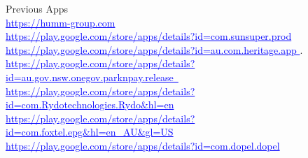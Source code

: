 \documentclass{article}
\begin{document}
Previous Apps \\
\textcolor{blue} { \underline{  https://humm-group.com  } }  \\
\textcolor{blue} { \underline{ https://play.google.com/store/apps/details?id=com.sunsuper.prod   } }  \\
\textcolor{blue} { \underline{  https://play.google.com/store/apps/details?id=au.com.heritage.app  }}. \\ 
\textcolor{blue} { \underline{ https://play.google.com/store/apps/details?id=au.gov.nsw.onegov.parknpay.release\  } }  \\  
\textcolor{blue} { \underline{https://play.google.com/store/apps/details?id=com.Rydotechnologies.Rydo\&hl=en  }}   \\
\textcolor{blue}{ \underline{https://play.google.com/store/apps/details?id=com.foxtel.epg\&hl=en\_AU\&gl=US } }  \\
\textcolor{blue}{ \underline{ https://play.google.com/store/apps/details?id=com.dopel.dopel   }}  \\
\\
\end{document}
